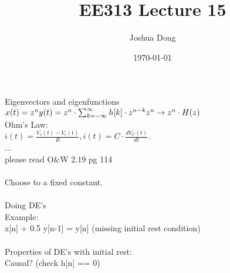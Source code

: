 \documentclass{article}
\begin{document}
\title{EE313\: Lecture 15}
\author{Joshua Dong}
\date{\today}
\maketitle

Eigenvectors and eigenfunctions
\\$x(t) = z^n
\\y(t) = z^n \cdot \sum_{k=-\infty}^{\infty}h[k] \cdot z^{n-k}
\\z^n \rightarrow z^n\cdot H(z)
\\$
\\Ohm's Law:
\\$i(t) = \frac{V_s(t) - V_c(t)}{R}, i(t) = C \cdot \frac{dV_C(t)}{dt}$.
\\...
\\please read O&W 2.19 pg 114
\\
\\Choose {} to a fixed constant.
\\
\\Doing DE's
\\Example:
\\x[n] + 0.5 y[n-1] = y[n] (missing initial rest condition)
\\
\\Properties of DE's with initial rest:
\\Causal? (check h[n] == 0)
\\
\end{document}
